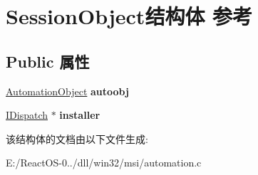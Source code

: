 \hypertarget{struct_session_object}{}\section{Session\+Object结构体 参考}
\label{struct_session_object}
\subsection*{Public 属性}
\begin{DoxyCompactItemize}
\item 
\mbox{\label{struct_session_object_aab0e2c2a02e5be8239aaab637d984326}} 
\hyperlink{struct_automation_object}{Automation\+Object} {\bfseries autoobj}
\item 
\mbox{\label{struct_session_object_a8be7ed23804d2282ba6f34b3a95023a0}} 
\hyperlink{interface_i_dispatch}{I\+Dispatch} $\ast$ {\bfseries installer}
\end{DoxyCompactItemize}


该结构体的文档由以下文件生成\+:\begin{DoxyCompactItemize}
\item 
E\+:/\+React\+O\+S-\/0../dll/win32/msi/automation.\+c\end{DoxyCompactItemize}
